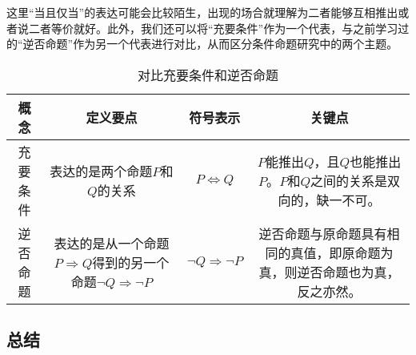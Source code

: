 这里“当且仅当”的表达可能会比较陌生，出现的场合就理解为二者能够互相推出或者说二者等价就好。此外，我们还可以将“充要条件”作为一个代表，与之前学习过的“逆否命题”作为另一个代表进行对比，从而区分条件命题研究中的两个主题。

\begin{table}[ht]
\centering
\caption{对比充要条件和逆否命题}\label{tab_HsCoPr6}
\begin{tabular}{|c|c|c|c|}
\hline
概念 & 定义要点 & 符号表示 & 关键点  \\
\hline
充要条件 & 表达的是两个命题$P$和$Q$的关系 & $P \Leftrightarrow Q$ & $P$能推出$Q$，且$Q$也能推出$P$。$P$和$Q$之间的关系是双向的，缺一不可。 \\ 
\hline
逆否命题 & 表达的是从一个命题$P \Rightarrow Q$得到的另一个命题$\neg Q \Rightarrow \neg P$ & $\neg Q \Rightarrow \neg P$ & 逆否命题与原命题具有相同的真值，即原命题为真，则逆否命题也为真，反之亦然。 \\ 
\hline
\end{tabular}
\end{table}

\subsection{总结}

